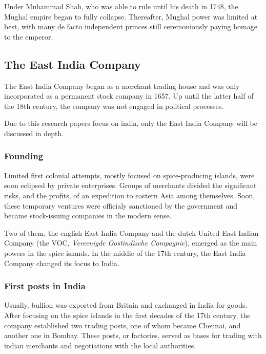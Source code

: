 \documentclass[11pt, a4paper, headings=standardclasses]{scrartcl}
\begin{document}
Under Muhammad Shah, who was able to rule until his death in 1748, the Mughal empire began to fully collapse. Thereafter, Mughal power was limited at best, with many de facto independent princes still ceremoniously paying homage to the emperor.\autocite{bose}

\subsection{The East India Company}

The East India Company began as a merchant trading house and was only incorporated as a permanent stock company in 1657.\autocite{EIC2} Up until the latter half of the 18th century, the company was not engaged in political processes.

Due to this research papers focus on india, only the East India Company will be discussed in depth.

\subsubsection{Founding}

Limited first colonial attempts, mostly focused on spice-producing islands, were soon eclipsed by private enterprises. Groups of merchants divided the significant risks, and the profits, of an expedition to eastern Asia among themselves. Soon, these temporary ventures were officialy sanctioned by the government and became stock-issuing companies in the modern sense.

Two of them, the english East India Company and the dutch United East Indian Company (the VOC, \textit{Vereenigde Oostindische Compagnie}), emerged as the main powers in the spice islands.\autocite{VOC} In the middle of the 17th century, the East India Company changed its focus to India.\autocite[Part I]{EIC}

\subsubsection{First posts in India}

Usually, bullion was exported from Britain and exchanged in India for goods.\autocite[Section \textit{The commodity structure of trade}]{FT} After focusing on the spice islands in the first decades of the 17th century, the company established two trading posts, one of whom became Chennai, and another one in Bombay. These posts, or factories, served as bases for trading with indian merchants and negotiations with the local authorities.\autocite{EIC}
\end{document}

